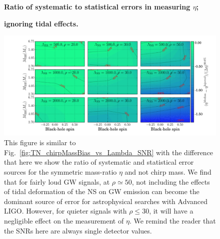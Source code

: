 \documentclass[aps,prd,amsmath,floats,floatfix, twocolumn,
superscriptaddress,nofootinbib,showpacs]{revtex4-1}
\begin{document}
%
\begin{figure}[!t]
\centering
\textbf{Ratio of systematic to statistical errors in measuring $\eta$;}\par
\textbf{ignoring tidal effects.}\par\medskip
\includegraphics[width=1.95\columnwidth]{plots/TNEtaBiasesOverCIWidths_CI90_0_Lambda_SNR20_50_linear}
\caption{This figure is similar to Fig.~\ref{fig:TN_chirpMassBias_vs_Lambda_SNR}
with the difference that here we show the ratio of systematic and statistical
error sources for the symmetric mass-ratio $\eta$ and not chirp mass. We find
that for fairly loud GW signals, at $\rho\simeq 50$, not including the
effects of tidal deformation of the NS on GW emission can become the dominant
source of error for astrophysical searches with Advanced LIGO. However, for
quieter signals with $\rho\leq 30$, it will have a negligible effect on the
measurement of $\eta$. We remind the reader that the SNRs here are always
single detector values.
}
\label{fig:TN_EtaBias_vs_Lambda_SNR}
\end{figure}
% 
% 
\end{document}

